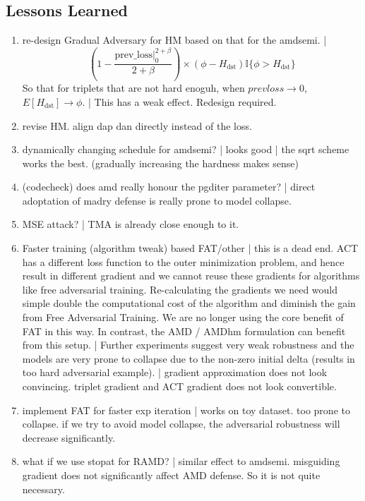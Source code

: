 \subsection{Lessons Learned}







\begin{enumerate}

	\item [\xmark] re-design Gradual Adversary for HM based on that for the amdsemi. |
		\[
			(1-\frac{\text{prev\_loss}|_0^{2+\beta}}{2+\beta}) \times
			(\phi - H_\text{dst})\mathbb{I}\{\phi > H_\text{dst}\}
		\]
		So that for triplets that are not hard enoguh, when
		$prevloss \rightarrow 0$, $E[H_\text{dst}]\rightarrow \phi$.
		| This has a weak effect. Redesign required.
	
	\item [\cmark] revise HM. align dap dan directly instead of the loss.

	\item [\cmark] \checkmark dynamically changing schedule for amdsemi? |
		looks good | the sqrt scheme works the best. (gradually increasing the
		hardness makes sense)

	\item [\cmark] (codecheck) does amd really honour the pgditer parameter? |
		direct adoptation of madry defense is really prone to model collapse.

	\item [\xmark] MSE attack? | TMA is already close enough to it.

	\item [\xmark] Faster training (algorithm tweak) based FAT/other | this is
		a dead end. ACT has a different loss function to the outer minimization
		problem, and hence result in different gradient and we cannot reuse
		these gradients for algorithms like free adversarial training.
		Re-calculating the gradients we need would simple double the
		computational cost of the algorithm and diminish the gain from Free
		Adversarial Training. We are no longer using the core benefit of FAT in
		this way. In contrast, the AMD / AMDhm formulation can benefit from
		this setup. | Further experiments suggest very weak robustness and the
		models are very prone to collapse due to the non-zero initial delta
		(results in too hard adversarial example).  | gradient approximation
		does not look convincing. triplet gradient and ACT gradient does not
		look convertible.

	\item [\cmark] implement FAT for faster exp iteration | works on toy
		dataset. too prone to collapse. if we try to avoid model collapse, the
		adversarial robustness will decrease significantly.

	\item [\cmark] what if we use stopat for RAMD? | similar effect to amdsemi.
		misguiding gradient does not significantly affect AMD defense. So it
		is not quite necessary.
	
\end{enumerate}
